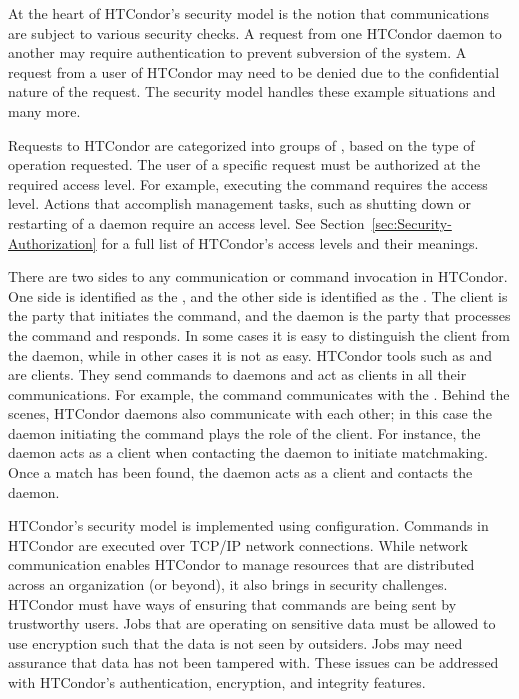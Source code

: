 At the heart of HTCondor's security model is the notion that 
communications are subject to various security checks. 
A request from one HTCondor daemon to another may require
authentication to prevent subversion of the system.
A request from a user of HTCondor may need to be denied
due to the confidential nature of the request.
The security model handles these example situations
and many more.

Requests to HTCondor are
categorized into groups of ,
based on the type of operation requested.
The user of a specific request must be authorized at
the required access level.
For example,
executing the  command requires
the  access level.
Actions that accomplish management tasks,
such as shutting down or restarting of a daemon
require an  access level.
See
Section~\ref{sec:Security-Authorization}
for a full list of HTCondor's access levels and their meanings.

There are two sides to any communication or command invocation in HTCondor.
One side is identified as the ,
and the other side is identified as the .
The client is the party that initiates the command,
and the daemon is the party that processes the command and responds.
In some cases it is easy to distinguish the
client from the daemon, while in other cases it is not as easy.
HTCondor tools such as  and  are clients.
They send commands to daemons and act as clients in all their communications.
For example, the  command communicates
with the .
Behind the scenes, HTCondor daemons also communicate with each other;
in this case the daemon initiating the command plays the role of the client.
For instance,
the  daemon acts as a client when contacting the
 daemon to initiate matchmaking.
Once a match has been found,
the  daemon acts as a client and contacts the
 daemon.

HTCondor's security model
is implemented using configuration.
Commands in HTCondor are executed over TCP/IP network connections.
While network communication enables HTCondor to manage
resources that are distributed across an organization (or beyond),
it also brings in security challenges.
HTCondor must have ways of ensuring that commands are being sent
by trustworthy users.
Jobs that are operating on sensitive data must be allowed to use
encryption such that the data is not seen by outsiders.
Jobs may need assurance that data has not been tampered with.
These issues
can be addressed with HTCondor's authentication,
encryption, and integrity features.



